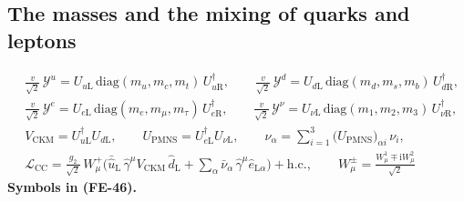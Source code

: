\documentclass[
  10pt,
]{article}
\begin{document}
\hypertarget{the-masses-and-the-mixing-of-quarks-and-leptons}{%
\subsection{The masses and the mixing of quarks and
leptons}\label{the-masses-and-the-mixing-of-quarks-and-leptons}}

\[
\begin{aligned}
&\frac{v}{\sqrt2}\,\mathcal{Y}^{u} = U_{u\mathrm{L}}\,\mathrm{diag}(m_u, m_c, m_t)\,U_{u\mathrm{R}}^\dagger,\qquad
 \frac{v}{\sqrt2}\,\mathcal{Y}^{d} = U_{d\mathrm{L}}\,\mathrm{diag}(m_d, m_s, m_b)\,U_{d\mathrm{R}}^\dagger,\\
&\frac{v}{\sqrt2}\,\mathcal{Y}^{e} = U_{e\mathrm{L}}\,\mathrm{diag}(m_e, m_\mu, m_\tau)\,U_{e\mathrm{R}}^\dagger,\qquad
 \frac{v}{\sqrt2}\,\mathcal{Y}^{\nu} = U_{\nu\mathrm{L}}\,\mathrm{diag}(m_1, m_2, m_3)\,U_{\nu\mathrm{R}}^\dagger,\\
&V_{\mathrm{CKM}} = U_{u\mathrm{L}}^\dagger U_{d\mathrm{L}},\qquad U_{\mathrm{PMNS}} = U_{e\mathrm{L}}^\dagger U_{\nu\mathrm{L}},\qquad
 \nu_\alpha = \sum_{i=1}^{3}\big(U_{\mathrm{PMNS}}\big)_{\alpha i}\,\nu_i,\\
&\mathcal{L}_{\mathrm{CC}} = \frac{g_2}{\sqrt2}\,W^+_\mu\Big(\bar{\hat u}_{\mathrm{L}}\,\hat\gamma^\mu V_{\mathrm{CKM}}\,\hat d_{\mathrm{L}}
 + \sum_\alpha\bar\nu_\alpha\,\hat\gamma^\mu\hat e_{\mathrm{L}\alpha}\Big) + \mathrm{h.c.},\qquad W^\pm_\mu = \frac{W^1_\mu \mp \mathrm{i}W^2_\mu}{\sqrt2}
\end{aligned} \tag{FE-46}
\] \textbf{Symbols in (FE-46).}
\end{document}
